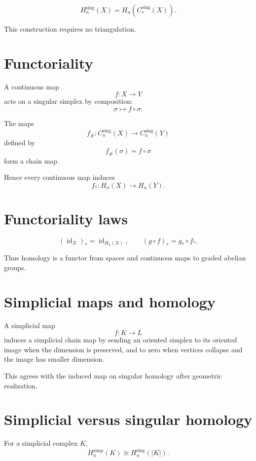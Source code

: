 \begin{definition}
\label{def:viii17-singular-homology}
\[
H_n^{\mathrm{sing}}(X)
=
H_n(C_*^{\mathrm{sing}}(X)).
\]
\end{definition}

This construction requires no triangulation.

\section{Functoriality}

A continuous map
\[
f:X\to Y
\]
acts on a singular simplex by composition:
\[
\sigma\longmapsto f\circ\sigma.
\]

\begin{theorem}
\label{thm:viii17-induced-chain}
The maps
\[
f_\#:C_n^{\mathrm{sing}}(X)\to C_n^{\mathrm{sing}}(Y)
\]
defined by
\[
f_\#(\sigma)=f\circ\sigma
\]
form a chain map.
\end{theorem}

Hence every continuous map induces
\[
f_*:H_n(X)\to H_n(Y).
\]

\section{Functoriality laws}

\[
(\operatorname{id}_X)_*=\operatorname{id}_{H_n(X)},
\qquad
(g\circ f)_*=g_*\circ f_*.
\]

Thus homology is a functor from spaces and continuous maps to graded abelian
groups.

\section{Simplicial maps and homology}

A simplicial map
\[
f:K\to L
\]
induces a simplicial chain map by sending an oriented simplex to its oriented
image when the dimension is preserved, and to zero when vertices collapse and
the image has smaller dimension.

This agrees with the induced map on singular homology after geometric
realization.

\section{Simplicial versus singular homology}

\begin{theorem}
\label{thm:viii17-comparison}
For a simplicial complex \(K\),
\[
H_n^{\mathrm{simp}}(K)
\cong
H_n^{\mathrm{sing}}(|K|).
\]
\end{theorem}

